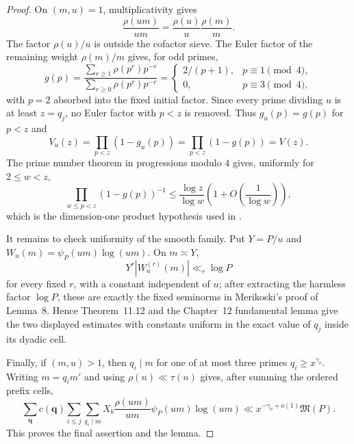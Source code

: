 \documentclass[10pt,reqno]{amsart}
\newcommand{\1}{\mathbf{1}}
\theoremstyle{plain}
\theoremstyle{remark}
\begin{document}
\begin{proof}
On $(m,u)=1$, multiplicativity gives
\[
 \frac{\rho(um)}{um}=\frac{\rho(u)}u\frac{\rho(m)}m.
\]
The factor $\rho(u)/u$ is outside the cofactor sieve.  The Euler factor of
the remaining weight $\rho(m)/m$ gives, for odd primes,
\[
 g(p)=
 \frac{\sum_{r\ge1}\rho(p^r)p^{-r}}
      {\sum_{r\ge0}\rho(p^r)p^{-r}}
 =\begin{cases}2/(p+1),&p\equiv1\pmod4,\\0,&p\equiv3\pmod4,
 \end{cases}
\]
with $p=2$ absorbed into the fixed initial factor.  Since every prime
dividing $u$ is at least $z=q_j$, no Euler factor with $p<z$ is removed.
Thus $g_u(p)=g(p)$ for $p<z$ and
\[
 V_u(z)=\prod_{p<z}(1-g_u(p))=\prod_{p<z}(1-g(p))=V(z).
\]
The prime number theorem in progressions modulo $4$ gives, uniformly for
$2\le w<z$,
\[
 \prod_{w\le p<z}(1-g(p))^{-1}
 \le\frac{\log z}{\log w}
 \left(1+O\!\left(\frac1{\log w}\right)\right),
\]
which is the dimension-one product hypothesis used in
\cite[Theorem 11.12 and Chapter 12]{FriedlanderIwaniec2010}.

It remains to check uniformity of the smooth family.  Put $Y=P/u$ and
\(W_u(m)=\psi_P(um)\log(um)\).  On $m\asymp Y$,
\[
 Y^r|W_u^{(r)}(m)|\ll_r\log P
\]
for every fixed $r$, with a constant independent of $u$; after extracting
the harmless factor $\log P$, these are exactly the fixed seminorms in
Merikoski's proof of Lemma~8.  Hence Theorem~11.12 and the Chapter~12
fundamental lemma give the two displayed estimates with constants uniform
in the exact value of $q_j$ inside its dyadic cell.

Finally, if $(m,u)>1$, then $q_i\mid m$ for one of at most three primes
$q_i\ge x^{\gamma_\nu}$.  Writing $m=q_i m'$ and using
$\rho(n)\ll\tau(n)$ gives, after summing the ordered prefix cells,
\[
 \sum_{\boldsymbol q}c(\boldsymbol q)
 \sum_{i\le j}\sum_{q_i\mid m}
 X_b\frac{\rho(um)}{um}\psi_P(um)\log(um)
 \ll x^{-\gamma_\nu+o(1)}\mathfrak M(P).
\]
This proves the final assertion and the lemma.
\end{proof}
\end{document}
